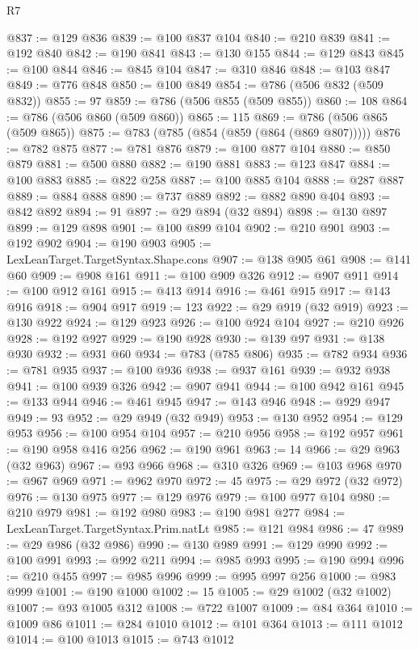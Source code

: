 \begin{lexlean}{R7}
\begin{coremodule}
@837 := @129 @836
@839 := @100 @837 @104
@840 := @210 @839
@841 := @192 @840
@842 := @190 @841
@843 := @130 @155
@844 := @129 @843
@845 := @100 @844
@846 := @845 @104
@847 := @310 @846
@848 := @103 @847
@849 := @776 @848
@850 := @100 @849
@854 := @786 (@506 @832 (@509 @832))
@855 := 97
@859 := @786 (@506 @855 (@509 @855))
@860 := 108
@864 := @786 (@506 @860 (@509 @860))
@865 := 115
@869 := @786 (@506 @865 (@509 @865))
@875 := @783 (@785 (@854 (@859 (@864 (@869 @807)))))
@876 := @782 @875
@877 := @781 @876
@879 := @100 @877 @104
@880 := @850 @879
@881 := @500 @880
@882 := @190 @881
@883 := @123 @847
@884 := @100 @883
@885 := @822 @258
@887 := @100 @885 @104
@888 := @287 @887
@889 := @884 @888
@890 := @737 @889
@892 := @882 @890 @404
@893 := @842 @892
@894 := 91
@897 := @29 @894 (@32 @894)
@898 := @130 @897
@899 := @129 @898
@901 := @100 @899 @104
@902 := @210 @901
@903 := @192 @902
@904 := @190 @903
@905 := LexLeanTarget.TargetSyntax.Shape.cons
@907 := @138 @905 @61
@908 := @141 @60
@909 := @908 @161
@911 := @100 @909 @326
@912 := @907 @911
@914 := @100 @912 @161
@915 := @413 @914
@916 := @461 @915
@917 := @143 @916
@918 := @904 @917
@919 := 123
@922 := @29 @919 (@32 @919)
@923 := @130 @922
@924 := @129 @923
@926 := @100 @924 @104
@927 := @210 @926
@928 := @192 @927
@929 := @190 @928
@930 := @139 @97
@931 := @138 @930
@932 := @931 @60
@934 := @783 (@785 @806)
@935 := @782 @934
@936 := @781 @935
@937 := @100 @936
@938 := @937 @161
@939 := @932 @938
@941 := @100 @939 @326
@942 := @907 @941
@944 := @100 @942 @161
@945 := @133 @944
@946 := @461 @945
@947 := @143 @946
@948 := @929 @947
@949 := 93
@952 := @29 @949 (@32 @949)
@953 := @130 @952
@954 := @129 @953
@956 := @100 @954 @104
@957 := @210 @956
@958 := @192 @957
@961 := @190 @958 @416 @256
@962 := @190 @961
@963 := 14
@966 := @29 @963 (@32 @963)
@967 := @93 @966
@968 := @310 @326
@969 := @103 @968
@970 := @967 @969
@971 := @962 @970
@972 := 45
@975 := @29 @972 (@32 @972)
@976 := @130 @975
@977 := @129 @976
@979 := @100 @977 @104
@980 := @210 @979
@981 := @192 @980
@983 := @190 @981 @277
@984 := LexLeanTarget.TargetSyntax.Prim.natLt
@985 := @121 @984
@986 := 47
@989 := @29 @986 (@32 @986)
@990 := @130 @989
@991 := @129 @990
@992 := @100 @991
@993 := @992 @211
@994 := @985 @993
@995 := @190 @994
@996 := @210 @455
@997 := @985 @996
@999 := @995 @997 @256
@1000 := @983 @999
@1001 := @190 @1000
@1002 := 15
@1005 := @29 @1002 (@32 @1002)
@1007 := @93 @1005 @312
@1008 := @722 @1007
@1009 := @84 @364
@1010 := @1009 @86
@1011 := @284 @1010
@1012 := @101 @364
@1013 := @111 @1012
@1014 := @100 @1013
@1015 := @743 @1012

\end{coremodule}
\end{lexlean}

